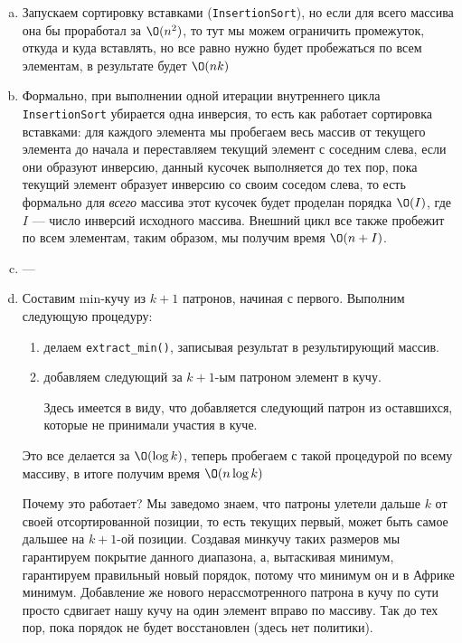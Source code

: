 \begin{solution}
    \begin{enumerate}[a)]
        \item Запускаем сортировку вставками (\texttt{InsertionSort}), но если для всего массива она бы проработал за $\O(n^2)$, то тут мы можем ограничить промежуток, откуда и куда вставлять, но все равно нужно будет пробежаться по всем элементам, в результате будет $\O(nk)$
        \item Формально, при выполнении одной итерации внутреннего цикла \texttt{InsertionSort} убирается одна инверсия, то есть как работает сортировка вставками: для каждого элемента мы пробегаем весь массив от текущего элемента до начала и переставляем текущий элемент с соседним слева, если они образуют инверсию, данный кусочек выполняется до тех пор, пока текущий элемент образует инверсию со своим соседом слева, то есть формально для \textit{всего} массива этот кусочек будет проделан порядка $\O(I)$, где $I$ --- число инверсий исходного массива. Внешний цикл все также пробежит по всем элементам, таким образом, мы получим время $\O(n + I)$.
        \item ---
        \item Составим min-кучу из $k+1$ патронов, начиная с первого. Выполним следующую процедуру:
        \begin{enumerate}[1)]
            \item делаем \texttt{extract\_min()}, записывая результат в результирующий массив.
            \item добавляем следующий за $k+1$-ым патроном элемент в кучу.
            \begin{remark}
                Здесь имеется в виду, что добавляется следующий патрон из оставшихся, которые не принимали участия в куче.
            \end{remark}
        \end{enumerate}
        Это все делается за $\O(\log k)$, теперь пробегаем с такой процедурой по всему массиву, в итоге получим время $\O(n\log k)$
        \begin{remark}
            Почему это работает? Мы заведомо знаем, что патроны улетели дальше $k$ от своей отсортированной позиции, то есть текущих первый, может быть самое дальшее на $k+1$-ой позиции. Создавая минкучу таких размеров мы гарантируем покрытие данного диапазона, а, вытаскивая минимум, гарантируем правильный новый порядок, потому что минимум он и в Африке минимум. Добавление же нового нерассмотренного патрона в кучу по сути просто сдвигает нашу кучу на один элемент вправо по массиву. Так до тех пор, пока порядок не будет восстановлен (здесь нет политики).
        \end{remark}
    \end{enumerate}
\end{solution}
